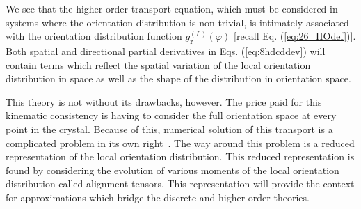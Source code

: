 We see that the higher-order transport equation, which must be considered in systems where the orientation distribution is non-trivial, is intimately associated with the orientation distribution function \(g^{(L)}_{\boldsymbol{r}}(\varphi)\) {[}recall Eq. (\ref{eq:26_HOdef}){]}. Both spatial and directional partial derivatives in Eqs. (\ref{eq:8hdcddev}) will contain terms which reflect the spatial variation of the local orientation distribution in space as well as the shape of the distribution in orientation space.

This theory is not without its drawbacks, however. The price paid for this kinematic consistency is having to consider the full orientation space at every point in the crystal. Because of this, numerical solution of this transport is a complicated problem in its own right~\cite{Sandfeld2010}. The way around this problem is a reduced representation of the local orientation distribution. This reduced representation is found by considering the evolution of various moments of the local orientation distribution called alignment tensors. This representation will provide the context for approximations which bridge the discrete and higher-order theories.

